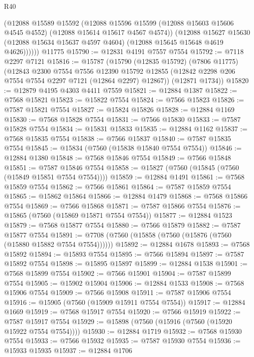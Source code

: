 \begin{lexlean}{R40}
\begin{coremodule}
          (@12088
            @15589
            @15592
            (@12088
              @15596
              @15599
              (@12088 @15603 @15606 @4545 @4552)
              (@12088 @15614 @15617 @4567 @4574))
            (@12088
              @15627
              @15630
              (@12088 @15634 @15637 @4597 @4604)
              (@12088 @15645 @15648 @4619 @4626))))))
    @11775
@15790 := @12831 @4191 @7557 @7554
@15792 := @7118 @2297 @7121
@15816 := @15787
    (@15790
      (@12835 @15792)
      (@7806 @11775)
      (@12843
        @2300
        @7554
        @7556
        @12390
        @15792
        @12855
        (@12842 @2298 @206 @7554 @7554 @2297 @7121 (@12864 @2297) @12867))
      (@12871 @1734))
@15820 := @12879 @4195 @4303 @4411 @7559
@15821 := @12884 @1387
@15822 := @7568 @15821
@15823 := @15822 @7554
@15824 := @7566 @15823
@15826 := @7587 @15821 @7554
@15827 := @15824 @15826
@15828 := @12884 @1169
@15830 := @7568 @15828 @7554
@15831 := @7566 @15830
@15833 := @7587 @15828 @7554
@15834 := @15831 @15833
@15835 := @12884 @1162
@15837 := @7568 @15835 @7554
@15838 := @7566 @15837
@15840 := @7587 @15835 @7554
@15845 := @15834 (@7560 (@15838 @15840 @7554 @7554))
@15846 := @12884 @1380
@15848 := @7568 @15846 @7554
@15849 := @7566 @15848
@15851 := @7587 @15846 @7554
@15858 := @15827 (@7560 (@15845 (@7560 (@15849 @15851 @7554 @7554))))
@15859 := @12884 @1491
@15861 := @7568 @15859 @7554
@15862 := @7566 @15861
@15864 := @7587 @15859 @7554
@15865 := @15862 @15864
@15866 := @12884 @1479
@15868 := @7568 @15866 @7554
@15869 := @7566 @15868
@15871 := @7587 @15866 @7554
@15876 := @15865 (@7560 (@15869 @15871 @7554 @7554))
@15877 := @12884 @1523
@15879 := @7568 @15877 @7554
@15880 := @7566 @15879
@15882 := @7587 @15877 @7554
@15891 := @7708 (@7560 (@15858 (@7560 (@15876 (@7560 (@15880 @15882 @7554 @7554))))))
@15892 := @12884 @1678
@15893 := @7568 @15892
@15894 := @15893 @7554
@15895 := @7566 @15894
@15897 := @7587 @15892 @7554
@15898 := @15895 @15897
@15899 := @12884 @1538
@15901 := @7568 @15899 @7554
@15902 := @7566 @15901
@15904 := @7587 @15899 @7554
@15905 := @15902 @15904
@15906 := @12884 @1533
@15908 := @7568 @15906 @7554
@15909 := @7566 @15908
@15911 := @7587 @15906 @7554
@15916 := @15905 (@7560 (@15909 @15911 @7554 @7554))
@15917 := @12884 @1669
@15919 := @7568 @15917 @7554
@15920 := @7566 @15919
@15922 := @7587 @15917 @7554
@15929 := @15898 (@7560 (@15916 (@7560 (@15920 @15922 @7554 @7554))))
@15930 := @12884 @1719
@15932 := @7568 @15930 @7554
@15933 := @7566 @15932
@15935 := @7587 @15930 @7554
@15936 := @15933 @15935
@15937 := @12884 @1706

\end{coremodule}
\end{lexlean}
